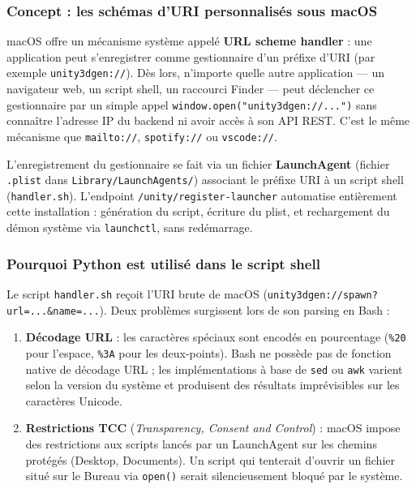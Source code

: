 \documentclass[12pt,a4paper,oneside]{report}
\begin{document}
\subsubsection{Concept : les schémas d'URI personnalisés sous macOS}

macOS offre un mécanisme système appelé \textbf{URL scheme handler} :
une application peut s'enregistrer comme gestionnaire d'un préfixe
d'URI (par exemple \texttt{unity3dgen://}). Dès lors, n'importe
quelle autre application --- un navigateur web, un script shell, un
raccourci Finder --- peut déclencher ce gestionnaire par un simple
appel \texttt{window.open("unity3dgen://...")} sans connaître
l'adresse IP du backend ni avoir accès à son API REST. C'est le
même mécanisme que \texttt{mailto://}, \texttt{spotify://} ou
\texttt{vscode://}.

L'enregistrement du gestionnaire se fait via un fichier
\textbf{LaunchAgent} (fichier \texttt{.plist} dans
\texttt{Library/LaunchAgents/}) associant le préfixe URI à un
script shell (\texttt{handler.sh}). L'endpoint
\texttt{/unity/register-launcher} automatise entièrement cette
installation : génération du script, écriture du plist, et
rechargement du démon système via \texttt{launchctl}, sans redémarrage.

\subsubsection{Pourquoi Python est utilisé dans le script shell}

Le script \texttt{handler.sh} reçoit l'URI brute de macOS
(\texttt{unity3dgen://spawn?url=...\&name=...}). Deux problèmes
surgissent lors de son parsing en Bash :

\begin{enumerate}
  \item \textbf{Décodage URL} : les caractères spéciaux sont encodés
    en pourcentage (\texttt{\%20} pour l'espace, \texttt{\%3A} pour
    les deux-points). Bash ne possède pas de fonction native de
    décodage URL ; les implémentations à base de \texttt{sed} ou
    \texttt{awk} varient selon la version du système et produisent
    des résultats imprévisibles sur les caractères Unicode.

  \item \textbf{Restrictions TCC} (\textit{Transparency, Consent and
    Control}) : macOS impose des restrictions aux scripts lancés par
    un LaunchAgent sur les chemins protégés (Desktop, Documents).
    Un script qui tenterait d'ouvrir un fichier situé sur le Bureau
    via \texttt{open()} serait silencieusement bloqué par le système.
\end{enumerate}
\end{document}
